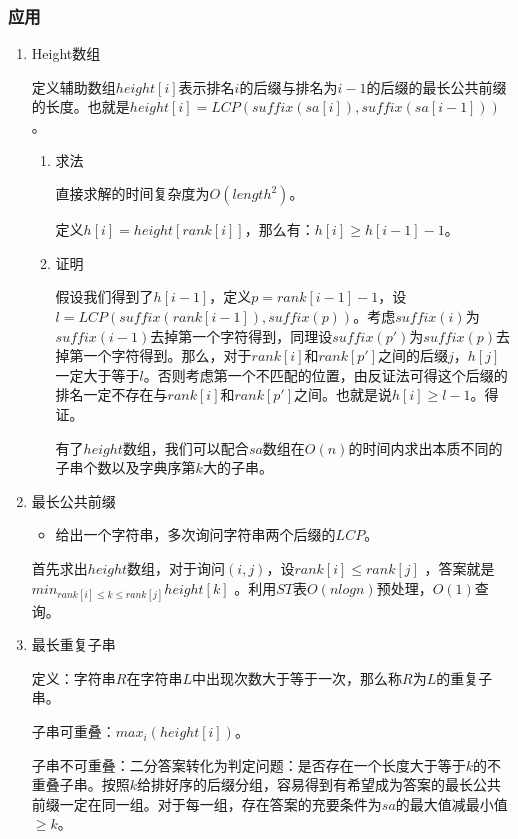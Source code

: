 \documentclass[11pt]{article}
\begin{document}
\subsubsection{应用}
\label{sec-3-3-3}
\begin{enumerate}
\item Height数组
\label{sec-3-3-3-1}

定义辅助数组\(height[i]\)表示排名\(i\)的后缀与排名为\(i-1\)的后缀的最长公共前缀的长度。也就是\(height[i]=LCP(suffix(sa[i]),suffix(sa[i-1]))\)。

\begin{enumerate}
\item 求法
\label{sec-3-3-3-1-1}

直接求解的时间复杂度为\(O(length^2)\)。

定义\(h[i]=height[rank[i]]\)，那么有：\(h[i] \geq h[i-1]-1\)。

\item 证明
\label{sec-3-3-3-1-2}

假设我们得到了\(h[i-1]\)，定义\(p=rank[i-1]-1\)，设\(l=LCP(suffix(rank[i-1]),suffix(p))\)。考虑\(suffix(i)\)为\(suffix(i-1)\)去掉第一个字符得到，同理设\(suffix(p')\)为\(suffix(p)\)去掉第一个字符得到。那么，对于\(rank[i]\)和\(rank[p']\)之间的后缀\(j\)，\(h[j]\)一定大于等于\(l\)。否则考虑第一个不匹配的位置，由反证法可得这个后缀的排名一定不存在与\(rank[i]\)和\(rank[p']\)之间。也就是说\(h[i] \geq l-1\)。得证。

有了\(height\)数组，我们可以配合\(sa\)数组在\(O(n)\)的时间内求出本质不同的子串个数以及字典序第\(k\)大的子串。
\end{enumerate}

\item 最长公共前缀
\label{sec-3-3-3-2}

\begin{itemize}
\item 给出一个字符串，多次询问字符串两个后缀的\(LCP\)。
\end{itemize}

首先求出\(height\)数组，对于询问\((i,j)\)，设\(rank[i]\leq rank[j]\) ，答案就是\(min_{rank[i]\leq k \leq rank[j]}height[k]\) 。利用\(ST\)表\(O(nlogn)\)预处理，\(O(1)\)查询。

\item 最长重复子串
\label{sec-3-3-3-3}

定义：字符串\(R\)在字符串\(L\)中出现次数大于等于一次，那么称\(R\)为\(L\)的重复子串。

子串可重叠：\(max_i(height[i])\)。

子串不可重叠：二分答案转化为判定问题：是否存在一个长度大于等于\(k\)的不重叠子串。按照\(k\)给排好序的后缀分组，容易得到有希望成为答案的最长公共前缀一定在同一组。对于每一组，存在答案的充要条件为\(sa\)的最大值减最小值\(\geq k\)。


\end{enumerate}
\end{document}
